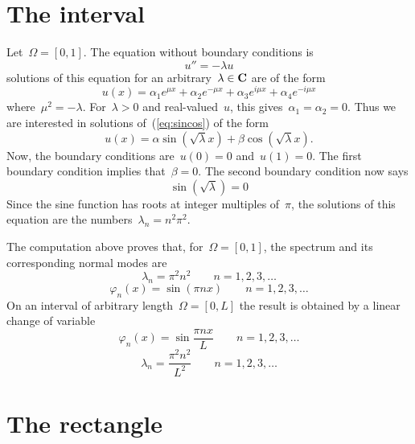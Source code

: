 \clearpage
\section{The interval}

Let~$\Omega=[0,1]$.  The equation without boundary conditions is
\begin{equation}\label{eq:sincos}
	u''=-\lambda u
\end{equation}
solutions of this equation for an arbitrary~$\lambda\in\mathbf{C}$ are of the form
\[
	u(x)=
	\alpha_1 e^{\mu x}
	+
	\alpha_2 e^{-\mu x}
	+
	\alpha_3 e^{i\mu x}
	+
	\alpha_4 e^{-i\mu x}
\]
where~$\mu^2=-\lambda$.  For~$\lambda>0$ and real-valued~$u$, this
gives~$\alpha_1=\alpha_2=0$.  Thus  we are interested in solutions
of~(\ref{eq:sincos}) of the form
\[
	u(x)=\alpha\sin\left(\sqrt{\lambda}
	x\right)+\beta\cos\left(\sqrt{\lambda}x\right).
\]
Now, the boundary conditions are~$u(0)=0$ and~$u(1)=0$.  The first
boundary condition implies that~$\beta=0$.  The second boundary
condition now says
\begin{equation}\label{eq:sinroots}
	\sin\left(\sqrt{\lambda}\right) = 0
\end{equation}
Since the sine function has roots at integer multiples of~$\pi$, the
solutions of this equation are the numbers~$\lambda_n=n^2\pi^2$.

The computation above proves that, for~$\Omega=[0,1]$, the
spectrum and its corresponding normal modes are
\[
	\lambda_n = \pi^2n^2
	\qquad n=1,2,3,\ldots
\]
\[
	\varphi_n(x) = \sin\left(\pi n x\right)
	\qquad n=1,2,3,\ldots
\]
On an interval of arbitrary length~$\Omega=[0,L]$ the result is
obtained by a linear change of variable
\[
	\varphi_n(x) = \sin\frac{\pi n x}L
	\qquad n=1,2,3,\ldots
\]
\[
	\lambda_n = \frac{\pi^2n^2}{L^2}
	\qquad n=1,2,3,\ldots
\]


\clearpage
\section{The rectangle}

